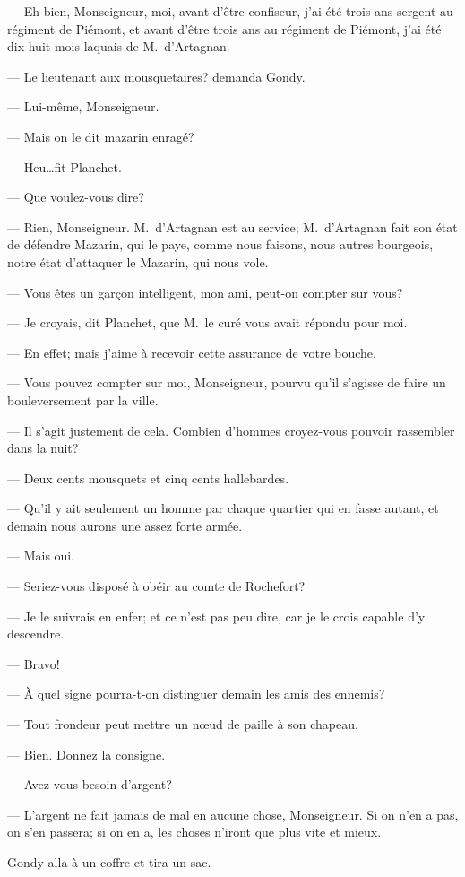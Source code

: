 — Eh bien, Monseigneur, moi, avant d'être confiseur, j'ai été trois ans sergent au régiment de Piémont, et avant d'être trois ans au régiment de Piémont, j'ai été dix-huit mois laquais de M.~d'Artagnan.

— Le lieutenant aux mousquetaires? demanda Gondy.

— Lui-même, Monseigneur.

— Mais on le dit mazarin enragé?

— Heu\dots fit Planchet.

— Que voulez-vous dire?

— Rien, Monseigneur. M.~d'Artagnan est au service; M.~d'Artagnan fait son état de défendre Mazarin, qui le paye, comme nous faisons, nous autres bourgeois, notre état d'attaquer le Mazarin, qui nous vole.

— Vous êtes un garçon intelligent, mon ami, peut-on compter sur vous?

— Je croyais, dit Planchet, que M.~le curé vous avait répondu pour moi.

— En effet; mais j'aime à recevoir cette assurance de votre bouche.

— Vous pouvez compter sur moi, Monseigneur, pourvu qu'il s'agisse de faire un bouleversement par la ville.

— Il s'agit justement de cela. Combien d'hommes croyez-vous pouvoir rassembler dans la nuit?

— Deux cents mousquets et cinq cents hallebardes.

— Qu'il y ait seulement un homme par chaque quartier qui en fasse autant, et demain nous aurons une assez forte armée.

— Mais oui.

— Seriez-vous disposé à obéir au comte de Rochefort?

— Je le suivrais en enfer; et ce n'est pas peu dire, car je le crois capable d'y descendre.

— Bravo!

— À quel signe pourra-t-on distinguer demain les amis des ennemis?

— Tout frondeur peut mettre un nœud de paille à son chapeau.

— Bien. Donnez la consigne.

— Avez-vous besoin d'argent?

— L'argent ne fait jamais de mal en aucune chose, Monseigneur. Si on n'en a pas, on s'en passera; si on en a, les choses n'iront que plus vite et mieux.

Gondy alla à un coffre et tira un sac.

